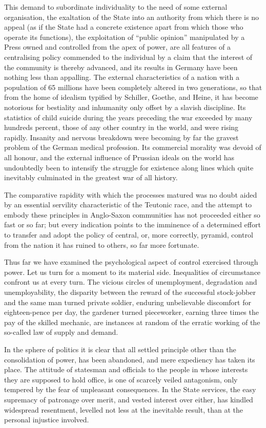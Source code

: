 \documentclass{book}
\begin{document}
This demand to subordinate individuality to the need of some external organisation, the exaltation of the State into an authority from which there is no appeal (as if the State had a concrete existence apart from which those who operate its functions), the exploitation of “public opinion” manipulated by a Press owned and controlled from the apex of power, are all features of a centralising policy commended to the individual by a claim that the interest of the community is thereby advanced, and its results in Germany have been nothing less than appalling. The external characteristics of a nation with a population of 65 millions have been completely altered in two generations, so that from the home of idealism typified by Schiller, Goethe, and Heine, it has become notorious for bestiality and inhumanity only offset by a slavish discipline. Its statistics of child suicide during the years preceding the war exceeded by many hundreds percent, those of any other country in the world, and were rising rapidly. Insanity and nervous breakdown were becoming by far the gravest problem of the German medical profession. Its commercial morality was devoid of all honour, and the external influence of Prussian ideals on the world has undoubtedly been to intensify the struggle for existence along lines which quite inevitably culminated in the greatest war of all history.

The comparative rapidity with which the processes matured was no doubt aided by an essential servility characteristic of the Teutonic race, and the attempt to embody these principles in Anglo-Saxon communities has not proceeded either so fast or so far; but every indication points to the imminence of a determined effort to transfer and adopt the policy of central, or, more correctly, pyramid, control from the nation it has ruined to others, so far more fortunate.

Thus far we have examined the psychological aspect of control exercised through power. Let us turn for a moment to its material side. Inequalities of circumstance confront us at every turn. The vicious circles of unemployment, degradation and unemployability, the disparity between the reward of the successful stock-jobber and the same man turned private soldier, enduring unbelievable discomfort for eighteen-pence per day, the gardener turned pieceworker, earning three times the pay of the skilled mechanic, are instances at random of the erratic working of the so-called law of supply and demand.

In the sphere of politics it is clear that all settled principle other than the consolidation of power, has been abandoned, and mere expediency has taken its place. The attitude of statesman and officials to the people in whose interests they are supposed to hold office, is one of scarcely veiled antagonism, only tempered by the fear of unpleasant consequences. In the State services, the easy supremacy of patronage over merit, and vested interest over either, has kindled widespread resentment, levelled not less at the inevitable result, than at the personal injustice involved.
\end{document}
